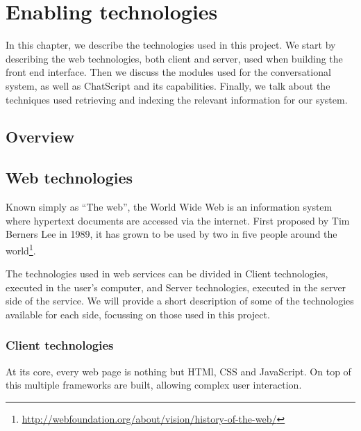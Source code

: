 \chapter{Enabling technologies}
\label{chap:enabling}

\begin{chapterintro}

In this chapter, we describe the technologies used in this project. We start by describing the web technologies, both client and server, used when building the front end interface. Then we discuss the modules used for the conversational system, as well as ChatScript and its capabilities. Finally, we talk about the techniques used retrieving and indexing the relevant information for our system.

\end{chapterintro}

\cleardoublepage

\section{Overview}

\section{Web technologies}



Known simply as ``The web'', the World Wide Web is an information system where hypertext documents are accessed via the internet. First proposed by Tim Berners Lee in 1989\cite{berners1989information}, it has grown to be used by two in five people around the world\footnote{\url{http://webfoundation.org/about/vision/history-of-the-web/}}.

The technologies used in web services can be divided in Client technologies, executed in the user's computer, and Server technologies, executed in the server side of the service. We will provide a short description of some of the technologies available for each side, focussing on those used in this project.
\subsection{Client technologies}

At its core, every web page is nothing but HTMl, CSS and JavaScript. On top of this multiple frameworks are built, allowing complex user interaction. 

